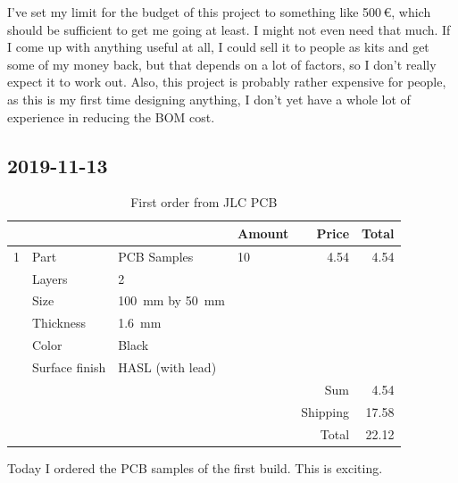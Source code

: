 \documentclass[a4paper]{article}
\begin{document}
I've set my limit for the budget of this project to something like 500\,€, which should be sufficient to get me going at least. I might not even need that much. If I come up with anything useful at all, I could sell it to people as kits and get some of my money back, but that depends on a lot of factors, so I don't really expect it to work out. Also, this project is probably rather expensive for people, as this is my first time designing anything, I don't yet have a whole lot of experience in reducing the BOM cost.

\subsection{2019-11-13}

\begin{table}[h!]
\centering
\caption{First order from JLC PCB}\label{tbl:order-2019-11-09}
\newcommand{\partline}[7]{
#1&Part&#2&#3&#4&#5\\
&Manufacturer Part&#6\\
&Description&#7\\}
\footnotesize
\begin{tabular}{@{}llp{5cm}lrr@{}}
\toprule
&&&Amount&Price&Total\\
\midrule
1 & Part & PCB Samples & 10 & 4.54 & 4.54\\
& Layers & 2\\
& Size & \SI{100}{\milli\meter} by \SI{50}{\milli\meter}\\
& Thickness & \SI{1.6}{\milli\meter}\\
& Color & Black\\
& Surface finish & HASL (with lead)\\
\midrule
&&&&Sum&4.54\\
&&&&Shipping&17.58\\
&&&&Total&22.12\\
\bottomrule
\end{tabular}
\end{table}

Today I ordered the PCB samples of the first build. This is exciting.
\end{document}
